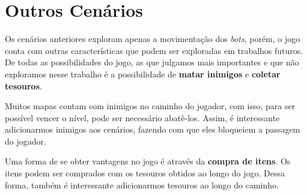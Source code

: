 \section{Outros Cenários}

Os cenários anteriores exploram apenas a movimentação dos \textit{bots}, porém,
o jogo conta com outras características que podem ser exploradas em trabalhos
futuros. De todas as possibilidades do jogo, as que julgamos mais importantes e
que não exploramos nesse trabalho é a possibilidade de \textbf{matar inimigos}
e \textbf{coletar tesouros}.

Muitos mapas contam com inimigos no caminho do jogador, com isso, para ser
possível vencer o nível, pode ser necessário abatê-los. Assim, é interessante
adicionarmos inimigos aos cenários, fazendo com que eles bloqueiem a passagem
do jogador.

Uma forma de se obter vantagens no jogo é através da \textbf{compra de itens}.
Os itens podem ser comprados com os tesouros obtidos ao longo do jogo. Dessa
forma, também é interessante adicionarmos tesouros ao longo do caminho.


